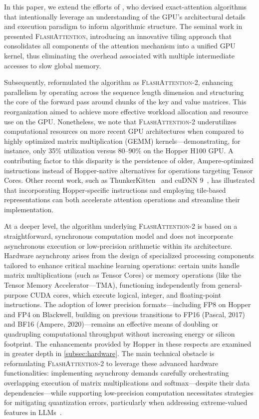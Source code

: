 In this paper, we extend the efforts of \citet{dao2022flashattention}, who devised exact-attention algorithms that intentionally leverage an understanding of the GPU’s architectural details and execution paradigm to inform algorithmic structure. The seminal work in \citep{dao2022flashattention} presented \textsc{FlashAttention}, introducing an innovative tiling approach that consolidates all components of the attention mechanism into a unified GPU kernel, thus eliminating the overhead associated with multiple intermediate accesses to slow global memory.

Subsequently, \citet{dao2023flashattention2} reformulated the algorithm as \textsc{FlashAttention-2}, enhancing parallelism by operating across the sequence length dimension and structuring the core of the forward pass around chunks of the key and value matrices. This reorganization aimed to achieve more effective workload allocation and resource use on the GPU. Nonetheless, we note that \textsc{FlashAttention-2} underutilizes computational resources on more recent GPU architectures when compared to highly optimized matrix multiplication (GEMM) kernels—demonstrating, for instance, only 35\% utilization versus 80–90\% on the Hopper H100 GPU. A contributing factor to this disparity is the persistence of older, Ampere-optimized instructions instead of Hopper-native alternatives for operations targeting Tensor Cores. Other recent work, such as ThunkerKitten~\citep{spector2024thunder} and cuDNN 9~\citep{cudnn9}, has illustrated that incorporating Hopper-specific instructions and employing tile-based representations can both accelerate attention operations and streamline their implementation.

At a deeper level, the algorithm underlying \textsc{FlashAttention-2} is based on a straightforward, synchronous computation model and does not incorporate asynchronous execution or low-precision arithmetic within its architecture. Hardware asynchrony arises from the design of specialized processing components tailored to enhance critical machine learning operations: certain units handle matrix multiplications (such as Tensor Cores) or memory operations (like the Tensor Memory Accelerator—TMA), functioning independently from general-purpose CUDA cores, which execute logical, integer, and floating-point instructions. The adoption of lower precision formats—including FP8 on Hopper and FP4 on Blackwell, building on previous transitions to FP16 (Pascal, 2017) and BF16 (Ampere, 2020)—remains an effective means of doubling or quadrupling computational throughput without increasing energy or silicon footprint. The enhancements provided by Hopper in these respects are examined in greater depth in \cref{subsec:hardware}. The main technical obstacle is reformulating \textsc{FlashAttention-2} to leverage these advanced hardware functionalities: implementing asynchrony demands carefully orchestrating overlapping execution of matrix multiplications and softmax—despite their data dependencies—while supporting low-precision computation necessitates strategies for mitigating quantization errors, particularly when addressing extreme-valued features in LLMs~\citep{dettmers2208llm, sun2024massive}.

